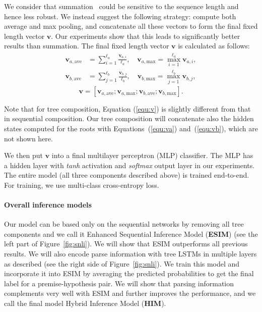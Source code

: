 \documentclass[11pt,a4paper]{article}
\newcommand{\vect}[1]{\mathbf{#1}}
\begin{document}
We consider that summation~\citep{Parikh:D16-1244} could be sensitive to the sequence length and hence less robust. We instead suggest the following strategy: compute both average and max pooling, and concatenate all these vectors to form the final fixed length vector $\vect{v}$. Our experiments show that this leads to significantly better results than summation. The final fixed length vector $\vect{v}$ is calculated as follows:
{\fontsize{10pt}{1.0cm}
	\begin{align}
		\vect{v}_{a,\text{ave}}&= \sum_{i=1}^{\ell_a}\frac{\vect{v}_{a,i}}{\ell_a}, \quad
		\vect{v}_{a,\text{max}}= \max_{i=1}^{\ell_a}\vect{v}_{a,i}, \\
		\vect{v}_{b,\text{ave}}&= \sum_{j=1}^{\ell_b}\frac{\vect{v}_{b,j}}{\ell_b}, \quad
		\vect{v}_{b,\text{max}}= \max_{j=1}^{\ell_b}\vect{v}_{b,j},
	\end{align}
    \vspace{-2mm}
	\begin{equation}
		\vect{v} = [\vect{v}_{a,\text{ave}}; \vect{v}_{a,\text{max}}; \vect{v}_{b,\text{ave}}; \vect{v}_{b,\text{max}}].
      \label{equ:v}
	\end{equation}
}

Note that for tree composition, Equation (\ref{equ:v}) is slightly different from that in sequential composition. Our tree composition will concatenate also the hidden states computed for the roots with Equations~(\ref{equ:va}) and~(\ref{equ:vb}), which are not shown here. 

We then put $\vect{v}$ into a final multilayer perceptron (MLP) classifier. The MLP has a hidden layer with \textit{tanh} activation and \textit{softmax} output layer in our experiments. The entire model (all three components described above) is trained end-to-end. For training, we use multi-class cross-entropy loss. 

\paragraph{Overall inference models}

Our model can be based only on the sequential networks by removing all tree components and we call it Enhanced Sequential Inference Model (\textbf{ESIM}) (see the left part of Figure~\ref{fig:snli}). We will show that ESIM outperforms all previous results. We will also encode parse information with tree LSTMs in multiple layers as described (see the right side of Figure~\ref{fig:snli}). We train this model and incorporate it into ESIM by averaging the predicted probabilities to get the final label for a premise-hypothesis pair. We will show that parsing information complements very well with ESIM and further improves the performance, and we call the final model Hybrid Inference Model (\textbf{HIM}).
\end{document}
